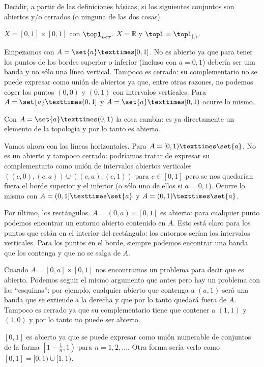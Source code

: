 \begin{problem}[8] Decidir, a partir de las definiciones básicas, si los siguientes conjuntos son abiertos y/o cerrados (o ninguna de las dos cosas).

\ppart $X = [0,1] × [0,1]$ con $\topl_{Lex}$.
\ppart $X=ℝ$ y $\topl = \topl_{[,)}$.

\solution

\spart Empezamos con $A = \set{a} × [0,1]$. No es abierto ya que para tener los puntos de los bordes superior o inferior (incluso con $a=0,1$) debería ser una banda y no sólo una línea vertical. Tampoco es cerrado: su complementario no se puede expresar como unión de abiertos ya que, entre otras razones, no podemos coger los puntos $(0,0)$ y $(0,1)$ con intervalos verticales. Para $A = \set{a}×(0,1]$ y $A = \set{a} × [0,1)$ ocurre lo mismo.

Con $A = \set{a} × (0,1)$ la cosa cambia: es ya directamente un elemento de la topología y por lo tanto es abierto.

Vamos ahora con las líneas horizontales. Para $A = [0,1) × \set{a}$. No es un abierto y tampoco cerrado: podríamos tratar de expresar su complementario como unión de intervalos abiertos verticales $((c,0), (c,a)) ∪ ((c,a), (c,1))$ para $c ∈ [0,1]$ pero se nos quedarían fuera el borde superior y el inferior (o sólo uno de ellos si $a = 0,1$). Ocurre lo mismo con $A = (0,1] × \set{a}$ y $A = (0,1) × \set{a}$.

Por último, los rectángulos. $A = (0,a) × [0,1]$ es abierto: para cualquier punto podemos encontrar un entorno abierto contenido en $A$. Esto está claro para los puntos que están en el interior del rectángulo: los entornos serían los intervalos verticales. Para los puntos en el borde, siempre podemos encontrar una banda que los contenga y que no se salga de $A$.

Cuando $A = [0,a] × [0,1]$ nos encontramos un problema para decir que es abierto. Podemos seguir el mismo argumento que antes pero hay un problema con las ``esquinas'': por ejemplo, cualquier abierto que contenga a $(a,1)$ será una banda que se extiende a la derecha y que por lo tanto quedará fuera de $A$. Tampoco es cerrado ya que su complementario tiene que contener a $(1,1)$ y $(1,0)$ y por lo tanto no puede ser abierto.

\spart $[0,1]$ es abierto ya que se puede expresar como unión numerable de conjuntos de la forma $\left[1-\frac{1}{n}, 1\right)$ para $n = 1,2,\dotsc$. Otra forma sería verlo como $[0,1] = [0,1) ∪ [1,1)$.


\end{problem}
